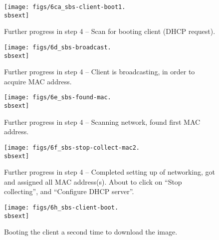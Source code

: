\clearpage

\begin{figure}[htbp]
  \begin{center}
    \centerline{\texttt{[image: figs/6ca\_sbs-client-boot1.\\sbsext]}}
    \caption{Further progress in step 4 -- Scan for booting client (DHCP
      request).}
    \label{fig:sbs-client-boot2}
  \end{center}
\end{figure}

\begin{figure}[htbp]
  \begin{center}
    \centerline{\texttt{[image: figs/6d\_sbs-broadcast.\\sbsext]}}
    \caption{Further progress in step 4 -- Client is broadcasting, in
      order to acquire MAC address.}
    \label{fig:sbs-collect-broadcast} 
  \end{center}
\end{figure}

\begin{figure}[htbp]
  \begin{center}
    \centerline{\texttt{[image: figs/6e\_sbs-found-mac.\\sbsext]}}
    \caption{Further progress in step 4 -- Scanning network, found
      first MAC address.}
    \label{fig:sbs-setup-network2}
  \end{center}
\end{figure}


\begin{figure}[htbp]
  \begin{center}
    \centerline{\texttt{[image: figs/6f\_sbs-stop-collect-mac2.\\sbsext]}}
   \caption[Further progress in step 4 -- Completed setup of
   networking.]{Further progress in step 4 -- Completed setting up of
     networking, got and assigned all MAC address(s).  About to click
     on ``Stop collecting'', and ``Configure DHCP server''.}
    \label{fig:sbs-setup-network3}
  \end{center}
\end{figure}


\begin{figure}[htbp]
  \begin{center}
    \centerline{\texttt{[image: figs/6h\_sbs-client-boot.\\sbsext]}}
    \caption{Booting the client a second time to download the image.}
    \label{fig:sbs-install-boot}
  \end{center}
\end{figure}

